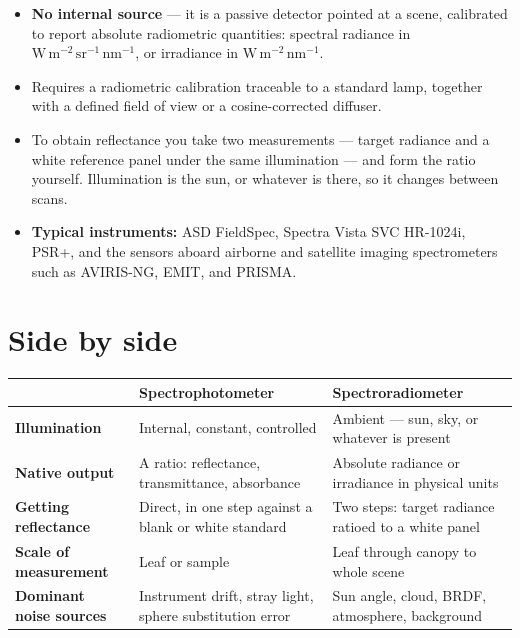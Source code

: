 \documentclass[11pt,letterpaper]{article}
\newcommand{\unit}[1]{\ensuremath{\mathrm{#1}}}
\begin{document}
\begin{itemize}
  \item \textbf{No internal source} --- it is a passive detector pointed at a scene, calibrated to
        report absolute radiometric quantities: spectral radiance in
        $\unit{W\,m^{-2}\,sr^{-1}\,nm^{-1}}$, or irradiance in $\unit{W\,m^{-2}\,nm^{-1}}$.
  \item Requires a radiometric calibration traceable to a standard lamp, together with a defined
        field of view or a cosine-corrected diffuser.
  \item To obtain reflectance you take two measurements --- target radiance and a white reference
        panel under the same illumination --- and form the ratio yourself. Illumination is the sun,
        or whatever is there, so it changes between scans.
  \item \textbf{Typical instruments:} ASD FieldSpec, Spectra Vista SVC HR-1024i, PSR+, and the
        sensors aboard airborne and satellite imaging spectrometers such as AVIRIS-NG, EMIT, and
        PRISMA.
\end{itemize}

\section{Side by side}

\vspace{0.3em}
\noindent
{\small\renewcommand{\arraystretch}{1.15}
\begin{tabularx}{\textwidth}{@{}>{\raggedright\arraybackslash}p{} L L@{}}
\toprule
& \textbf{Spectrophotometer} & \textbf{Spectroradiometer} \\
\midrule
\textbf{Illumination}
  & Internal, constant, controlled
  & Ambient --- sun, sky, or whatever is present \\[0.4em]
\textbf{Native output}
  & A ratio: reflectance, transmittance, absorbance
  & Absolute radiance or irradiance in physical units \\[0.4em]
\textbf{Getting reflectance}
  & Direct, in one step against a blank or white standard
  & Two steps: target radiance ratioed to a white panel \\[0.4em]
\textbf{Scale of measurement}
  & Leaf or sample
  & Leaf through canopy to whole scene \\[0.4em]
\textbf{Dominant noise sources}
  & Instrument drift, stray light, sphere substitution error
  & Sun angle, cloud, BRDF, atmosphere, background \\
\bottomrule
\end{tabularx}
}
\vspace{0.6em}
\end{document}
